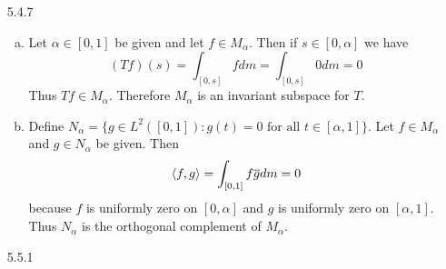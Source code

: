 \documentclass[../../Solutions.tex]{subfiles}
\begin{document}
\begin{itemize}
	\item [5.4.7]
		\begin{enumerate}[(a)]
			\item Let $\alpha\in[0,1]$ be given and let $f \in M_\alpha$. Then if $s \in [0,\alpha]$ we have
				$$ (Tf)(s) = \int_{[0,s]} f dm = \int_{[0,s]} 0 dm = 0 $$
				Thus $Tf \in M_\alpha$. Therefore $M_\alpha$ is an invariant subspace for $T$.
			\item Define $N_\alpha = \{ g \in L^2([0,1]) : g(t) = 0 \text{ for all } t \in [\alpha,1] \}$.
				Let $f \in M_\alpha$ and $g \in N_\alpha$ be given. Then
				$$ \langle f,g \rangle = \int_{[0,1]} f\overline{g} dm = 0 $$
				because $f$ is uniformly zero on $[0,\alpha]$ and $g$ is uniformly zero on $[\alpha,1]$.
				Thus $N_\alpha$ is the orthogonal complement of $M_\alpha$.
		\end{enumerate}
		
	\item [5.5.1]
	
\end{itemize}
\end{document}
